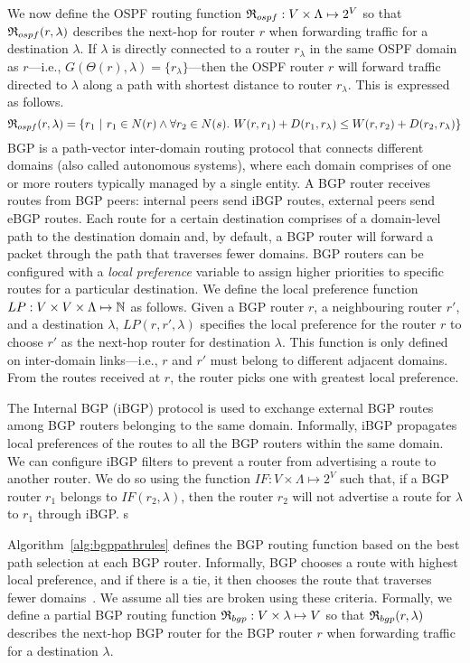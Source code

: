 We now define the OSPF routing function $\mathfrak{R}_{ospf}: 
V \times \Lambda \mapsto 2^V$ so that
$\mathfrak{R}_{ospf}(r,\lambda)$
 describes the next-hop for
router $r$ when forwarding traffic for a destination $\lambda$. 
If $\lambda$ is directly connected to a router $r_\lambda$ in the same OSPF domain as 
$r$---i.e., $G(\Theta(r),\lambda) = \{r_\lambda\}$---then 
the OSPF router $r$ will forward traffic directed to $\lambda$ along a path with
shortest distance to router $r_\lambda$. This is expressed as follows. 
\[
\mathfrak{R}_{ospf}(r,\lambda) = \{r_1 ~|~ r_1 \in N(r)\wedge \forall r_2 \in N(s) .~W(r, r_1) + D(r_1, r_\lambda) \le 
W(r, r_2) + D(r_2, r_\lambda)\}
\]
 BGP is a path-vector inter-domain routing protocol
that connects different domains (also called autonomous systems), where each domain
comprises of one or more routers typically managed by a single
entity. A BGP router receives routes from BGP peers: internal peers
send iBGP routes, external peers send eBGP routes. Each route for 
a certain
destination comprises of a domain-level path to the destination
domain and, by default, a BGP router will forward a packet through the path that traverses fewer domains.
BGP routers can be configured with a
\emph{local preference} variable to assign higher priorities to
specific routes for a 
particular destination. We define the local
preference function $LP: V \times V \times \Lambda \mapsto \mathbb{N}$ as
follows.  Given a BGP router $r$, a neighbouring router $r'$, and  
a destination $\lambda$, $LP(r, r', \lambda)$ specifies the local
preference for the router $r$ to choose $r'$ as the next-hop router for destination $\lambda$.  This function is only defined
on inter-domain links---i.e., $r$ and $r'$ must belong to different adjacent domains.  
From the routes received at $r$, the router
picks one with greatest local preference.

The Internal BGP (iBGP) protocol is used to 
exchange external BGP routes 
among BGP routers belonging
to the same domain. Informally, iBGP propagates local preferences of the routes to all the BGP routers within the same domain. 
We can configure iBGP 
filters to prevent a router from advertising 
a route to another router. We do so using the 
function $IF: V \times \Lambda \mapsto 2^V$
such that,
if a BGP router $r_1$ belongs to  $IF(r_2, \lambda)$, then
the router $r_2$ will not advertise a route for $\lambda$ to
$r_1$ through iBGP. 
 s
 
Algorithm~\ref{alg:bgppathrules} defines the BGP routing function
based on the best path selection at each BGP router. 
Informally, BGP 
chooses a route with highest local preference, and
if there is a tie, it then chooses the route that traverses fewer domains~\cite{bgp}. 
We assume all ties 
are broken using these criteria. 
Formally, we define a partial BGP routing function 
$\mathfrak{R}_{bgp}: V \times \lambda \mapsto V$
so that
$\mathfrak{R}_{bgp}(r,\lambda)$
 describes the next-hop BGP router for
 the BGP
router $r$ when forwarding traffic for a destination $\lambda$. 

